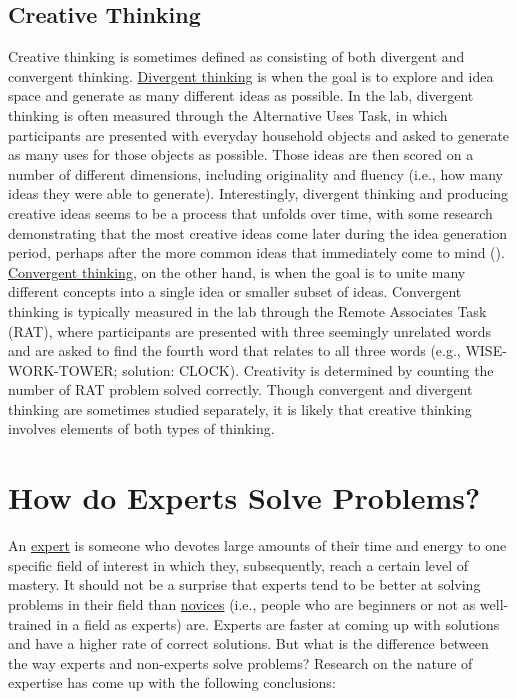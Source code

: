\documentclass[
]{krantz}
\begin{document}
\subsection*{Creative Thinking}\label{creative-thinking}


Creative thinking is sometimes defined as consisting of both divergent and convergent thinking. \hyperref[divergent-thinking]{Divergent thinking} is when the goal is to explore and idea space and generate as many different ideas as possible. In the lab, divergent thinking is often measured through the Alternative Uses Task, in which participants are presented with everyday household objects and asked to generate as many uses for those objects as possible. Those ideas are then scored on a number of different dimensions, including originality and fluency (i.e., how many ideas they were able to generate). Interestingly, divergent thinking and producing creative ideas seems to be a process that unfolds over time, with some research demonstrating that the most creative ideas come later during the idea generation period, perhaps after the more common ideas that immediately come to mind (). \hyperref[convergent-thinking]{Convergent thinking}, on the other hand, is when the goal is to unite many different concepts into a single idea or smaller subset of ideas. Convergent thinking is typically measured in the lab through the Remote Associates Task (RAT), where participants are presented with three seemingly unrelated words and are asked to find the fourth word that relates to all three words (e.g., WISE-WORK-TOWER; solution: CLOCK). Creativity is determined by counting the number of RAT problem solved correctly. Though convergent and divergent thinking are sometimes studied separately, it is likely that creative thinking involves elements of both types of thinking.

\section{How do Experts Solve Problems?}\label{how-do-experts-solve-problems}

An \hyperref[expert]{expert} is someone who devotes large amounts of their time and energy to one specific field of interest in which they, subsequently, reach a certain level of mastery. It should not be a surprise that experts tend to be better at solving problems in their field than \href{novice}{novices} (i.e., people who are beginners or not as well-trained in a field as experts) are. Experts are faster at coming up with solutions and have a higher rate of correct solutions. But what is the difference between the way experts and non-experts solve problems? Research on the nature of expertise has come up with the following conclusions:
\end{document}
